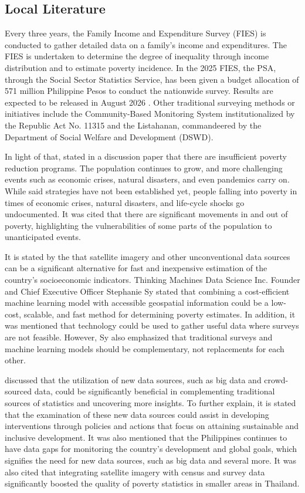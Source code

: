 \documentclass[12pt, letterpaper]{article}
\numberwithin{figure}{section}
\numberwithin{table}{section}
\begin{document}
\subsection{Local Literature}
Every three years, the Family Income and Expenditure Survey (FIES) is
conducted to gather detailed data on a family's income and
expenditures. The FIES is undertaken to determine the degree of
inequality through income distribution and to estimate poverty
incidence. In the 2025 FIES, the PSA, through the Social Sector
Statistics Service, has been given a budget allocation of 571 million
Philippine Pesos to conduct the nationwide survey. Results are
expected to be released in August 2026 \parencite{PSA2025}. Other
traditional surveying methods or initiatives include the
Community-Based Monitoring System institutionalized by the Republic
Act No. 11315 and the Listahanan, commandeered by the Department of
Social Welfare and Development (DSWD).

In light of that, \textcite{Reyes2010} stated in a discussion paper
that there are insufficient poverty reduction programs. The
population continues to grow, and more challenging events such as
economic crises, natural disasters, and even pandemics carry on.
While said strategies have not been established yet, people falling
into poverty in times of economic crises, natural disasters, and
life-cycle shocks go undocumented. It was cited that there are
significant movements in and out of poverty, highlighting the
vulnerabilities of some parts of the population to unanticipated events.

It is stated by the \textcite{PIDS2020} that satellite imagery and
other unconventional data sources can be a significant alternative
for fast and inexpensive estimation of the country's socioeconomic
indicators. Thinking Machines Data Science Inc. Founder and Chief
Executive Officer Stephanie Sy stated that combining a cost-efficient
machine learning model with accessible geospatial information could
be a low-cost, scalable, and fast method for determining poverty
estimates. In addition, it was mentioned that technology could be
used to gather useful data where surveys are not feasible. However,
Sy also emphasized that traditional surveys and machine learning
models should be complementary, not replacements for each other.

\textcite{Vizmanos2022} discussed that the utilization of new data
sources, such as big data and crowd-sourced data, could be
significantly beneficial in complementing traditional sources of
statistics and uncovering more insights. To further explain, it is
stated that the examination of these new data sources could assist in
developing interventions through policies and actions that focus on
attaining sustainable and inclusive development. It was also
mentioned that the Philippines continues to have data gaps for
monitoring the country's development and global goals, which
signifies the need for new data sources, such as big data and several
more. It was also cited that integrating satellite imagery with
census and survey data significantly boosted the quality of poverty
statistics in smaller areas in Thailand.
\end{document}
